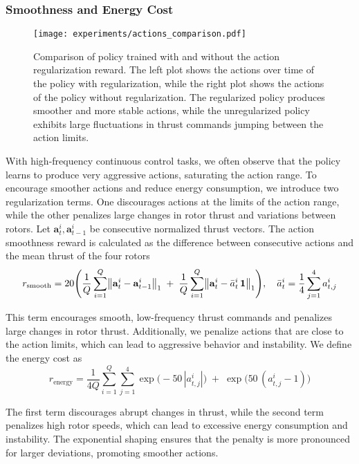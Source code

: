\subsubsection{Smoothness and Energy Cost}
\begin{figure}[ht]
    \centering
    \texttt{[image: experiments/actions\_comparison.pdf]}
    \caption[Action Regularization]{Comparison of policy trained with and without the action regularization reward. The left plot shows the actions over time of the policy with regularization, while the right plot shows the actions of the policy without regularization. The regularized policy produces smoother and more stable actions, while the unregularized policy exhibits large fluctuations in thrust commands jumping between the action limits.}
    \label{fig:actions_comparison}  
\end{figure}
With high-frequency continuous control tasks, we often observe that the policy learns to produce very aggressive actions, saturating the action range. To encourage smoother actions and reduce energy consumption, we introduce two regularization terms. One discourages actions at the limits of the action range, while the other penalizes large changes in rotor thrust and variations between rotors. Let \(\mathbf{a}_t^i,\mathbf{a}_{t-1}^i\) be consecutive normalized thrust vectors. The action smoothness reward is calculated as the difference between consecutive actions and the mean thrust of the four rotors
\begin{equation}
r_{\rm smooth} = 20
\Biggl(
\frac{1}{Q}\sum_{i=1}^Q \bigl\lVert \mathbf{a}_t^i - \mathbf{a}_{t-1}^i \bigr\rVert_1
\;+\;
\frac{1}{Q}\sum_{i=1}^Q \bigl\lVert \mathbf{a}_t^i - \bar a_t^i\,\mathbf{1}\bigr\rVert_1
\Biggr), \quad \bar a_t^i = \frac{1}{4}\sum_{j=1}^4 a_{t,j}^i
\end{equation}

This term encourages smooth, low-frequency thrust commands and penalizes large changes in rotor thrust. Additionally, we penalize actions that are close to the action limits, which can lead to aggressive behavior and instability. We define the energy cost as
\begin{equation}
r_{\mathrm{energy}} = \frac{1}{4Q}
\sum_{i=1}^{Q}\sum_{j=1}^{4}\exp\bigl(-50\,|a_{t,j}^i|\bigr)\;+\;\exp\bigl(50\,(a_{t,j}^i-1)\bigr)
\end{equation}

The first term discourages abrupt changes in thrust, while the second term penalizes high rotor speeds, which can lead to excessive energy consumption and instability. The exponential shaping ensures that the penalty is more pronounced for larger deviations, promoting smoother actions. 

